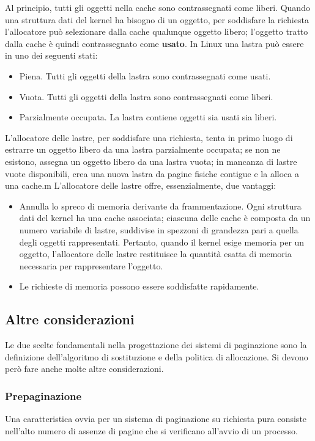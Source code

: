 \documentclass[11pt,a4paper]{article}
\begin{document}
{Al principio, tutti gli oggetti nella cache sono
contrassegnati come liberi. Quando una struttura dati del kernel ha bisogno di un oggetto,
per soddisfare la richiesta l'allocatore può selezionare dalla cache qualunque oggetto libero;
l'oggetto tratto dalla cache è quindi contrassegnato come \textbf{usato}.
In Linux una lastra può essere in uno dei seguenti stati:
\begin{itemize}
  \item Piena. Tutti gli oggetti della lastra sono contrassegnati come usati.
  \item Vuota. Tutti gli oggetti della lastra sono contrassegnati come liberi.
  \item Parzialmente occupata. La lastra contiene oggetti sia usati sia liberi.
\end{itemize}
%
L'allocatore delle lastre, per soddisfare una richiesta, tenta in primo luogo di estrarre un og­getto libero da una lastra parzialmente occupata; se non ne esistono, assegna un oggetto li­bero da una lastra vuota; in mancanza di lastre vuote disponibili, crea una nuova lastra da
pagine fisiche contigue e la alloca a una cache.m
L'allocatore delle lastre offre, essenzialmente, due vantaggi:
\begin{itemize}
  \item Annulla lo spreco di memoria derivante da frammentazione. Ogni struttura dati del kernel ha una cache associata; ciascuna delle cache è composta da un numero variabile di lastre, suddivise in spezzoni di grandezza pari a quella degli oggetti rappresentati. Pertanto, quando il kernel esi­ge memoria per un oggetto, l'allocatore delle lastre restituisce la quantità esatta di me­moria necessaria per rappresentare l'oggetto.
  \item Le richieste di memoria possono essere soddisfatte rapidamente.
\end{itemize}

\subsection{Altre considerazioni}
Le due scelte fondamentali nella progettazione dei sistemi di paginazione sono la definizio­ne dell'algoritmo di sostituzione e della politica di allocazione. Si devono però fare anche molte altre considerazioni.

\subsubsection{Prepaginazione}
Una caratteristica ovvia per un sistema di paginazione su richiesta pura consiste nell'alto nu­mero di assenze di pagine che si verificano all'avvio di un processo.

}
\end{document}
